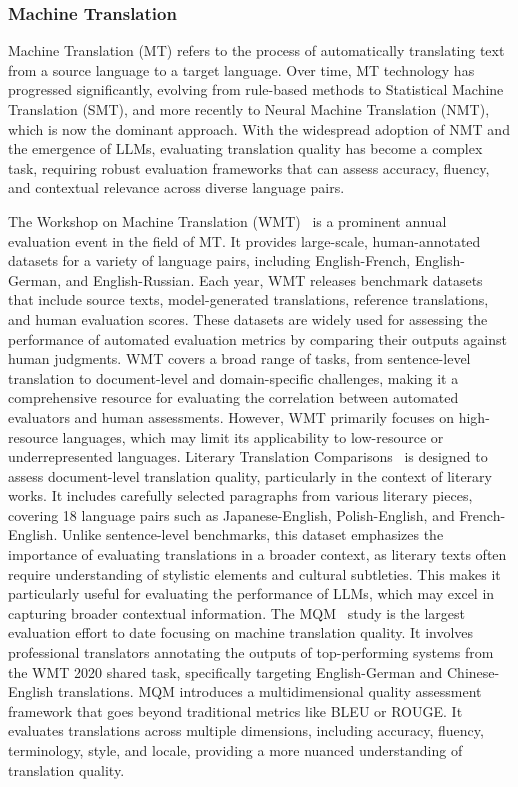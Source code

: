 \subsubsection{Machine Translation}
\label{sec:Machine Translation}
Machine Translation (MT) refers to the process of automatically translating text from a source language to a target language. Over time, MT technology has progressed significantly, evolving from rule-based methods to Statistical Machine Translation (SMT), and more recently to Neural Machine Translation (NMT), which is now the dominant approach. With the widespread adoption of NMT and the emergence of LLMs, evaluating translation quality has become a complex task, requiring robust evaluation frameworks that can assess accuracy, fluency, and contextual relevance across diverse language pairs.

The Workshop on Machine Translation (WMT)~\cite{freitag2021results} is a prominent annual evaluation event in the field of MT. It provides large-scale, human-annotated datasets for a variety of language pairs, including English-French, English-German, and English-Russian. Each year, WMT releases benchmark datasets that include source texts, model-generated translations, reference translations, and human evaluation scores. These datasets are widely used for assessing the performance of automated evaluation metrics by comparing their outputs against human judgments. WMT covers a broad range of tasks, from sentence-level translation to document-level and domain-specific challenges, making it a comprehensive resource for evaluating the correlation between automated evaluators and human assessments. However, WMT primarily focuses on high-resource languages, which may limit its applicability to low-resource or underrepresented languages.
Literary Translation Comparisons~\cite{karpinska2023large} is designed to assess document-level translation quality, particularly in the context of literary works. It includes carefully selected paragraphs from various literary pieces, covering 18 language pairs such as Japanese-English, Polish-English, and French-English. Unlike sentence-level benchmarks, this dataset emphasizes the importance of evaluating translations in a broader context, as literary texts often require understanding of stylistic elements and cultural subtleties. This makes it particularly useful for evaluating the performance of LLMs, which may excel in capturing broader contextual information.
The MQM~\cite{freitag2021experts} study is the largest evaluation effort to date focusing on machine translation quality. It involves professional translators annotating the outputs of top-performing systems from the WMT 2020 shared task, specifically targeting English-German and Chinese-English translations. MQM introduces a multidimensional quality assessment framework that goes beyond traditional metrics like BLEU or ROUGE. It evaluates translations across multiple dimensions, including accuracy, fluency, terminology, style, and locale, providing a more nuanced understanding of translation quality.



